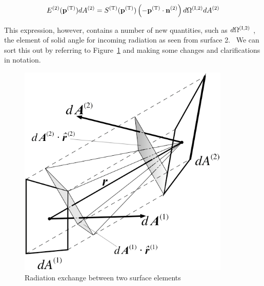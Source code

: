 \begin{equation}
{E^{{\rm{(2)}}}}({{\bf{p}}^{{\rm{(T)}}}})d{A^{{\rm{(2)}}}} = {S^{{\rm{(T)}}}}({{\bf{p}}^{{\rm{(T)}}}})\left( { - {{\bf{p}}^{{\rm{(T)}}}}\cdot {{\bf{n}}^{{\rm{(2)}}}}} \right)d{\Omega ^{{\rm{(I,2)}}}}d{A^{{\rm{(2)}}}}
\end{equation}

This expression, however, contains a number of new quantities, such as \(d{\Omega ^{{\rm{(I,2)}}}}\) , the element of solid angle for incoming radiation as seen from surface 2.~ We can sort this out by referring to Figure~\ref{fig:radiation-exchange-between-two-surface} and making some changes and clarifications in notation.

\begin{figure}[hbtp] %
\centering
\includegraphics[width=0.9\textwidth, height=0.9\textheight, keepaspectratio=true]{media/image1275.png}
\caption{Radiation exchange between two surface elements \protect \label{fig:radiation-exchange-between-two-surface}}
\end{figure}

